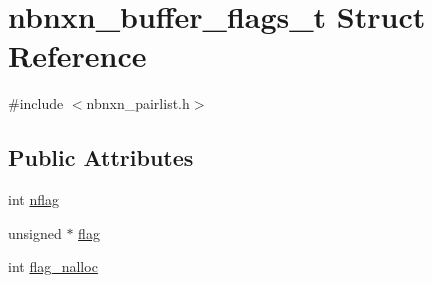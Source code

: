 \hypertarget{structnbnxn__buffer__flags__t}{\section{nbnxn\-\_\-buffer\-\_\-flags\-\_\-t \-Struct \-Reference}
\label{structnbnxn__buffer__flags__t}
}


{\ttfamily \#include $<$nbnxn\-\_\-pairlist.\-h$>$}

\subsection*{\-Public \-Attributes}
\begin{DoxyCompactItemize}
\item 
int \hyperlink{structnbnxn__buffer__flags__t_a7ebdb89f01264982c53be650ec393f95}{nflag}
\item 
unsigned $\ast$ \hyperlink{structnbnxn__buffer__flags__t_a8a425dfc66fbd6f1f165a18a20a4fbbe}{flag}
\item 
int \hyperlink{structnbnxn__buffer__flags__t_a15c43e07c6629d40d3388da173ca4943}{flag\-\_\-nalloc}
\end{DoxyCompactItemize}


